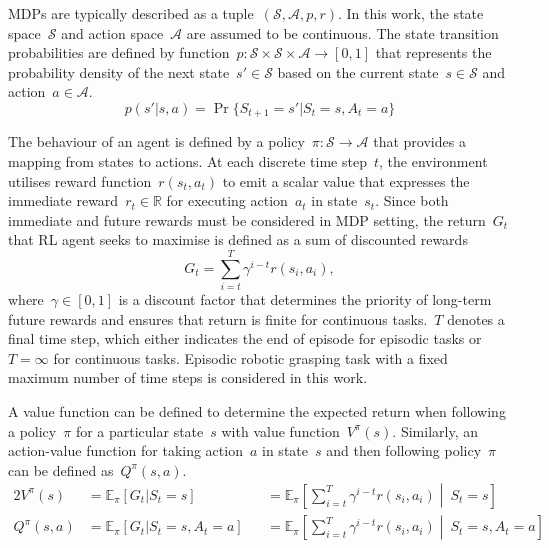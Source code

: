 MDPs are typically described as a tuple~\((\mathcal{S}, \mathcal{A}, p, r)\). In this work, the state space~\(\mathcal{S}\) and action space~\(\mathcal{A}\) are assumed to be continuous. The state transition probabilities are defined by function~\(p : \mathcal{S} \times \mathcal{S} \times \mathcal{A} \rightarrow [0, 1]\) that represents the probability density of the next state~\(s' \in \mathcal{S}\) based on the current state~\(s \in \mathcal{S}\) and action~\(a \in \mathcal{A}\).
\begin{equation}
    p(s' \vert s, a) = \Pr\{S_{t+1}{=}s' \vert S_{t}{=}s, A_{t}{=}a\}
\end{equation}

The behaviour of an agent is defined by a policy~\(\pi : \mathcal{S} \rightarrow \mathcal{A}\) that provides a mapping from states to actions. At each discrete time step~\(t\), the environment utilises reward function~\(r(s_{t}, a_{t})\) to emit a scalar value that expresses the immediate reward~\(r_{t} \in \mathbb{R}\) for executing action~\(a_{t}\) in state~\(s_{t}\). Since both immediate and future rewards must be considered in MDP setting, the return~\(G_{t}\) that RL agent seeks to maximise is defined as a sum of discounted rewards
\begin{equation}
    G_{t} = \sum\limits_{i=t}^T \gamma^{i-t} r(s_{i}, a_{i}),
\end{equation}
where~\(\gamma \in [0, 1]\) is a discount factor that determines the priority of long-term future rewards and ensures that return is finite for continuous tasks.~\(T\) denotes a final time step, which either indicates the end of episode for episodic tasks or~\(T=\infty\) for continuous tasks. Episodic robotic grasping task with a fixed maximum number of time steps is considered in this work.

A value function can be defined to determine the expected return when following a policy~\(\pi\) for a particular state~\(s\) with value function~\(V^{\pi}(s)\). Similarly, an action-value function for taking action~\(a\) in state~\(s\) and then following policy~\(\pi\) can be defined as~\(Q^{\pi}(s, a)\).
\begin{alignat}{2}
    V^{\pi}(s)    & = \mathbb{E}_{\pi} [G_{t} \vert S_{t}{=}s]            &  & = \mathbb{E}_{\pi} \left[ \sum\limits_{i=t}^T \gamma^{i-t} r(s_{i}, a_{i}) \middle\vert\ S_{t}{=}s \right]
    \label{eq:state_value_function}                                                                                                                                                                  \\
    Q^{\pi}(s, a) & = \mathbb{E}_{\pi} [G_{t} \vert S_{t}{=}s, A_{t}{=}a] &  & = \mathbb{E}_{\pi} \left[ \sum\limits_{i=t}^T \gamma^{i-t} r(s_{i}, a_{i}) \middle\vert\ S_{t}{=}s, A_{t}{=}a \right]
    \label{eq:action_value_function}
\end{alignat}

